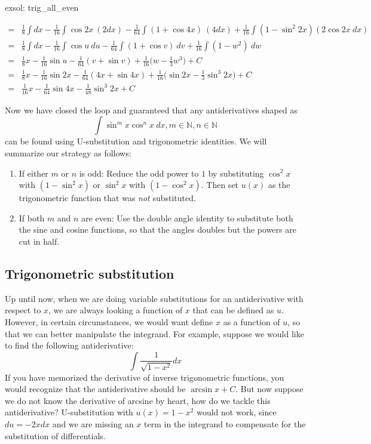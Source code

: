 \begin{exsol}[]{exsol: trig_all_even}
\begin{enumerate}[a)]
\begin{align*}
            =&\frac{1}{8} \int dx - \frac{1}{16} \int \cos 2x~(2dx) - \frac{1}{64} \int (1+\cos 4x)~(4dx) + \frac{1}{16} \int (1-\sin^2 2x) (2\cos 2x~dx)\\
            =&\frac{1}{8} \int dx - \frac{1}{16} \int \cos u~du - \frac{1}{64} \int (1 + \cos v)~dv + \frac{1}{16} \int (1-w^2)~dw\\
            =&\frac{1}{8}x - \frac{1}{16}\sin u - \frac{1}{64}(v + \sin v) + \frac{1}{16}\Big(w-\frac{1}{3}w^3\Big) + C\\
            =&\frac{1}{8}x - \frac{1}{16}\sin 2x - \frac{1}{64}(4x + \sin 4x) + \frac{1}{16}\Big(\sin 2x-\frac{1}{3}\sin^3 2x\Big) + C\\
            =&\frac{1}{16}x - \frac{1}{64}\sin 4x -\frac{1}{48}\sin^3 2x + C
        \end{align*}
    \end{enumerate}
\end{exsol}
Now we have closed the loop and guaranteed that any antiderivatives shaped as 
\[\int \sin^m x \cos^n x~dx,  m \in \mathbb{N}, n \in \mathbb{N}\]
can be found using U-substitution and trigonometric identities.  We will summarize our strategy as follows:
\begin{enumerate}
    \item If either $m$ or $n$ is odd: Reduce the odd power to $1$ by substituting $\cos^2 x$ with $(1-\sin^2 x)$ or $\sin^2 x$ with $(1-\cos^2 x)$.  Then set $u(x)$ as the trigonometric function that was \textit{not} substituted.
    \item If both $m$ and $n$ are even: Use the double angle identity to substitute both the sine and cosine functions, so that the angles doubles but the powers are cut in half.
\end{enumerate}

\subsection{Trigonometric substitution}
Up until now, when we are doing variable substitutions for an antiderivative with respect to $x$, we are always looking a function of $x$ that can be defined as $u$.  However, in certain circumstances, we would want define $x$ as a function of $u$, so that we can better manipulate the integrand.  For example, suppose we would like to find the following antiderivative:
\[\int \frac{1}{\sqrt{1-x^2}} dx\]
If you have memorized the derivative of inverse trigonometric functions, you would recognize that the antiderivative should be $\arcsin x + C$.  But now suppose we do not know the derivative of arcsine by heart, how do we tackle this antiderivative?  U-substitution with $u(x) = 1-x^2$ would not work, since $du = -2xdx$ and we are missing an $x$ term in the integrand to compensate for the substitution of differentials.


